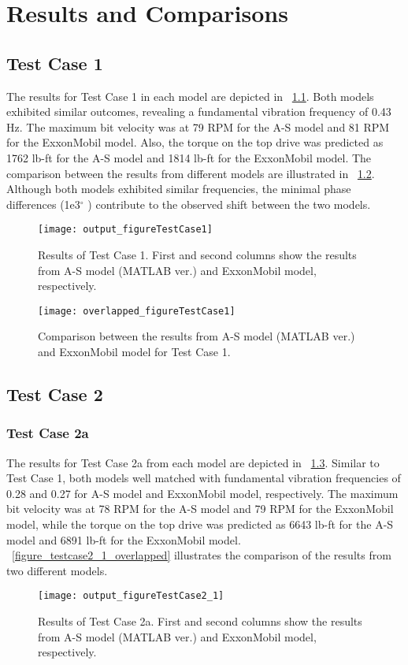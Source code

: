 \chapter{Results and Comparisons} 
\label{ch:results} 
\section{Test Case 1}
The results for Test Case 1 in each model are depicted in \figurename~\ref{figure_testcase1}. Both models exhibited similar outcomes, revealing a fundamental vibration frequency of 0.43 Hz. The maximum bit velocity was at 79 RPM for the A-S model and 81 RPM for the ExxonMobil model. Also, the torque on the top drive was predicted as 1762 lb-ft for the A-S model and 1814 lb-ft for the ExxonMobil model. The comparison between the results from different models are illustrated in \figurename~\ref{figure_testcase1_overlapped}. Although both models exhibited similar frequencies, the minimal phase differences (1e3$^{\circ}$ ) contribute to the observed shift between the two models.
\begin{figure}
  \centering
  \texttt{[image: output\_figureTestCase1]}
  \caption[Results of Test Case 1]{Results of Test Case 1. First and second columns show the results from A-S model (MATLAB ver.) and ExxonMobil model, respectively.}\label{figure_testcase1}
\end{figure}

\begin{figure}
  \centering
  \texttt{[image: overlapped\_figureTestCase1]}
  \caption[Comparison of the results for Test Case 1]{Comparison between the results from A-S model (MATLAB ver.) and ExxonMobil model for Test Case 1.}\label{figure_testcase1_overlapped}
\end{figure}

\section{Test Case 2}
\subsection{Test Case 2a}
The results for Test Case 2a from each model are depicted in \figurename~\ref{figure_testcase2_1}. Similar to Test Case 1, both models well matched with fundamental vibration frequencies of 0.28 and 0.27 for A-S model and ExxonMobil model, respectively. The maximum bit velocity was at 78 RPM for the A-S model and 79 RPM for the ExxonMobil model, while the torque on the top drive was predicted as 6643 lb-ft for the A-S model and 6891 lb-ft for the ExxonMobil model. \figurename~\ref{figure_testcase2_1_overlapped} illustrates the comparison of the results from two different models. 
\begin{figure}
  \centering
  \texttt{[image: output\_figureTestCase2\_1]}
  \caption[Results of Test Case 2a]{Results of Test Case 2a. First and second columns show the results from A-S model (MATLAB ver.) and ExxonMobil model, respectively.}\label{figure_testcase2_1}
\end{figure}


